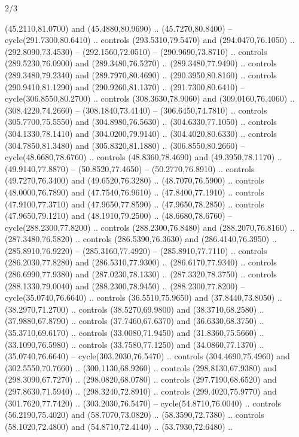 \begin{flagdescription}{2/3}
\begin{scope}[xshift=0.5\flaglength,yshift=0.5\flagwidth,scale=\stretchfactor]
\begin{scope}[scale=0.001645\flagwidth,yshift=65mm,xshift=-63mm]
\begin{scope}[y=0.80pt, x=0.80pt, yscale=-1,]
\begin{scope}[cm={{1.33333,0.0,0.0,1.33333,(0.0,1e-05)}}]
  (45.2110,81.0700) and (45.4880,80.9690) .. (45.7270,80.8400) --
  cycle(291.7300,80.6410) .. controls (293.5310,79.5470) and (294.0470,76.1050)
  .. (292.8090,73.4530) -- (292.1560,72.0510) -- (290.9690,73.8710) .. controls
  (289.5230,76.0900) and (289.3480,76.5270) .. (289.3480,77.9490) .. controls
  (289.3480,79.2340) and (289.7970,80.4690) .. (290.3950,80.8160) .. controls
  (290.9410,81.1290) and (290.9260,81.1370) .. (291.7300,80.6410) --
  cycle(306.8550,80.2700) .. controls (308.3630,78.9060) and (309.0160,76.4060)
  .. (308.4220,74.2660) -- (308.1840,73.4140) -- (306.6450,74.7810) .. controls
  (305.7700,75.5550) and (304.8980,76.5630) .. (304.6330,77.1050) .. controls
  (304.1330,78.1410) and (304.0200,79.9140) .. (304.4020,80.6330) .. controls
  (304.7850,81.3480) and (305.8320,81.1880) .. (306.8550,80.2660) --
  cycle(48.6680,78.6760) .. controls (48.8360,78.4690) and (49.3950,78.1170) ..
  (49.9140,77.8870) -- (50.8520,77.4650) -- (50.2770,76.8910) .. controls
  (49.7270,76.3400) and (49.6520,76.3280) .. (48.7070,76.5900) .. controls
  (48.0000,76.7890) and (47.7540,76.9610) .. (47.8400,77.1910) .. controls
  (47.9100,77.3710) and (47.9650,77.8590) .. (47.9650,78.2850) .. controls
  (47.9650,79.1210) and (48.1910,79.2500) .. (48.6680,78.6760) --
  cycle(288.2300,77.8200) .. controls (288.2300,76.8480) and (288.2070,76.8160)
  .. (287.3480,76.5820) .. controls (286.5390,76.3630) and (286.4140,76.3950) ..
  (285.8910,76.9220) -- (285.3160,77.4920) -- (285.8910,77.7110) .. controls
  (286.2030,77.8280) and (286.5310,77.9300) .. (286.6170,77.9340) .. controls
  (286.6990,77.9380) and (287.0230,78.1330) .. (287.3320,78.3750) .. controls
  (288.1330,79.0040) and (288.2300,78.9450) .. (288.2300,77.8200) --
  cycle(35.0740,76.6640) .. controls (36.5510,75.9650) and (37.8440,73.8050) ..
  (38.2970,71.2700) .. controls (38.5270,69.9800) and (38.3710,68.2580) ..
  (37.9880,67.8790) .. controls (37.7460,67.6370) and (36.6330,68.3750) ..
  (35.3710,69.6170) .. controls (33.0080,71.9450) and (31.8360,75.5660) ..
  (33.1090,76.5980) .. controls (33.7580,77.1250) and (34.0860,77.1370) ..
  (35.0740,76.6640) -- cycle(303.2030,76.5470) .. controls (304.4690,75.4960)
  and (302.5550,70.7660) .. (300.1130,68.9260) .. controls (298.8130,67.9380)
  and (298.3090,67.7270) .. (298.0820,68.0780) .. controls (297.7190,68.6520)
  and (297.8630,71.5940) .. (298.3240,72.8910) .. controls (299.4020,75.9770)
  and (301.7620,77.7420) .. (303.2030,76.5470) -- cycle(54.8710,76.0040) ..
  controls (56.2190,75.4020) and (58.7070,73.0820) .. (58.3590,72.7380) ..
  controls (58.1020,72.4800) and (54.8710,72.4140) .. (53.7930,72.6480) ..

\end{scope}
\end{scope}
\end{scope}
\end{scope}
\end{flagdescription}
